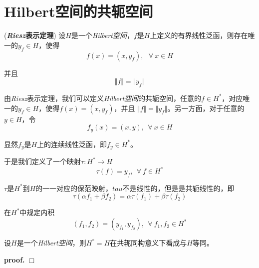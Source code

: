 \section{Hilbert空间的共轭空间}

\begin{mdframed}
    \begin{theorem}
        (\textbf{\textsl{Riesz}表示定理}) 设$H$是一个\textsl{Hilbert空间}，$f$是$H$上定义的有界线性泛函，则存在唯一的$y_f\in H$，使得
        \begin{equation}
            f(x)=(x,y_f),\ \ \ \forall\ x\in H
        \end{equation}

        并且
        \begin{equation}
            \Vert f\Vert=\Vert y_f\Vert
        \end{equation}
    \end{theorem}
\end{mdframed}

由\textsl{Riesz}表示定理，我们可以定义\textsl{Hilbert空间}的共轭空间，任意的$f\in H^*$，对应唯一的$y_f\in H$，使得$f(x)=(x,y_f)$，并且
$\Vert f\Vert=\Vert y_f\Vert$。另一方面，对于任意的$y\in H$，令
\begin{equation}
    f_y(x)=(x,y),\ \ \forall\ x\in H
\end{equation}

显然$f_y$是$H$上的连续线性泛函，即$f_y\in H^*$。

于是我们定义了一个映射$\tau:H^*\rightarrow H$
\begin{equation}
    \tau(f)=y_f,\ \ \forall\ f\in H^*
\end{equation}

$\tau$是$H^*$到$H$的一一对应的保范映射，$tau$不是线性的，但是是共轭线性的，即
\begin{equation}
    \tau(\alpha f_1+\beta f_2)=\alpha \tau(f_1)+\beta \tau(f_2)
\end{equation}

在$H^*$中规定内积
\begin{equation}
    (f_1,f_2)=(y_{f_1},y_{f_2}),\ \ \forall\ f_1,f_2\in H^*
\end{equation}

\begin{mdframed}
    \begin{theorem}
        设$H$是一个\textsl{Hilbert空间}，则$H^*=H$在共轭同构意义下看成与$H$等同。
    \end{theorem}
\end{mdframed}
\textbf{proof.} $\Box$

